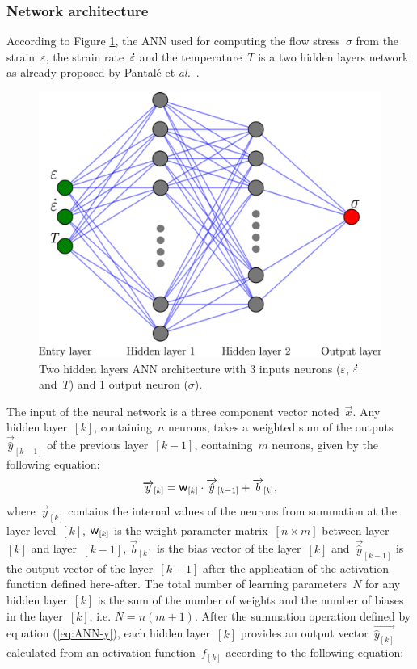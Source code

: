 \documentclass[algorithms,article,submit,pdftex,oneauthors]{Definitions/mdpi}
\makeatletter
\DeclareRobustCommand{\w}{\mbox{\large\ensuremath{\mathsf{w}}}}
\DeclareRobustCommand{\lay}[1]{_{[#1]}}
\DeclareRobustCommand{\Lay}[1]{\mbox{$[#1]$}}
\DeclareRobustCommand{\mdot}[1]{\accentset{\mbox{\bfseries .}}{#1}}
\DeclareRobustCommand{\eal}{et \emph{al.}\@\xspace}
\makeatother
\begin{document}
\subsubsection{Network architecture}\label{subsubsec:ANN-arch}
According to Figure \ref{fig:ANN-2HL}, the ANN used for computing the flow stress~$\sigma$ from the strain~$\varepsilon$, the strain rate~$\mdot{\varepsilon}$ and the temperature~$T$ is a two hidden layers network as already proposed by Pantalé \eal~\cite{Pantale-2021-EIN, Pantale-2023-DIA}.
\begin{figure}[h!]
\centering
\includegraphics[width=0.55\columnwidth]{Figures/ANN-2HL}
\caption{Two hidden layers ANN architecture with 3 inputs neurons ($\varepsilon$, $\mdot{\varepsilon}$ and~$T$) and 1 output neuron ($\sigma$).}
\label{fig:ANN-2HL}
\end{figure}
The input of the neural network is a three component vector noted~$\overrightarrow{x}$.
Any hidden layer~\Lay{k}, containing~$n$ neurons, takes a weighted sum of the outputs~$\overrightarrow{\hat{y}}\lay{k-1}$ of the previous layer~\Lay{k-1}, containing~$m$ neurons, given by the following equation:
\begin{equation}
\overrightarrow{y}\lay{k} = \w\lay{k} \cdot \overrightarrow{\hat{y}}\lay{k-1}+ \overrightarrow{b}\lay{k}\label{eq:ANN-y},
\end{equation}
where~$\overrightarrow{y}\lay{k}$ contains the internal values of the neurons from summation at the layer level~\Lay{k}, $\w\lay{k}$ is the weight parameter matrix~$[n\times m]$ between layer~\Lay{k} and layer~\Lay{k-1}, $\overrightarrow{b}\lay{k}$ is the bias vector of the layer~\Lay{k} and~$\overrightarrow{\hat{y}}\lay{k-1}$ is the output vector of the layer~\Lay{k-1} after the application of the activation function defined here-after.
The total number of learning parameters~$N$ for any hidden layer~\Lay{k} is the sum of the number of weights and the number of biases in the layer~\Lay{k}, i.e. $N=n(m+1)$.
After the summation operation defined by equation (\ref{eq:ANN-y}), each hidden layer~\Lay{k} provides an output vector~$\overrightarrow{\hat{y}\lay{k}}$ calculated from an activation function~$f\lay{k}$ according to the following equation:
\end{document}
